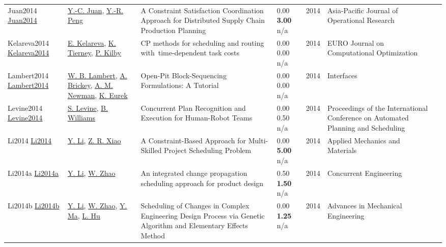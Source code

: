 {\begin{longtable}{p{3cm}p{5cm}p{10cm}p{1cm}rp{2.5cm}l}
Juan2014 \href{http://dx.doi.org/10.1142/s0217595914500419}{Juan2014} & \hyperref[auth:a1981]{Y.-C. Juan}, \hyperref[auth:a1982]{Y.-R. Peng} & A Constraint Satisfaction Coordination Approach for Distributed Supply Chain Production Planning & \noindent{}\textcolor{black!50}{0.00} \textbf{3.00} n/a & 2014 & Asia-Pacific Journal of Operational Research & \cite{Juan2014}\\
Kelareva2014 \href{http://dx.doi.org/10.1007/s13675-014-0022-7}{Kelareva2014} & \hyperref[auth:a332]{E. Kelareva}, \hyperref[auth:a333]{K. Tierney}, \hyperref[auth:a334]{P. Kilby} & \cellcolor{gold!20}CP methods for scheduling and routing with time-dependent task costs & \noindent{}\textcolor{black!50}{0.00} \textcolor{black!50}{0.00} n/a & 2014 & EURO Journal on Computational Optimization & \cite{Kelareva2014}\\
Lambert2014 \href{http://dx.doi.org/10.1287/inte.2013.0731}{Lambert2014} & \hyperref[auth:a1558]{W. B. Lambert}, \hyperref[auth:a1559]{A. Brickey}, \hyperref[auth:a1560]{A. M. Newman}, \hyperref[auth:a1561]{K. Eurek} & Open-Pit Block-Sequencing Formulations: A Tutorial & \noindent{}\textcolor{black!50}{0.00} \textcolor{black!50}{0.00} n/a & 2014 & \cellcolor{red!20}Interfaces & \cite{Lambert2014}\\
Levine2014 \href{http://dx.doi.org/10.1609/icaps.v24i1.13672}{Levine2014} & \hyperref[auth:a1927]{S. Levine}, \hyperref[auth:a1928]{B. Williams} & Concurrent Plan Recognition and Execution for Human-Robot Teams & \noindent{}\textcolor{black!50}{0.00} 0.50 n/a & 2014 & Proceedings of the International Conference on Automated Planning and Scheduling & \cite{Levine2014}\\
Li2014 \href{http://dx.doi.org/10.4028/www.scientific.net/amm.681.265}{Li2014} & \hyperref[auth:a1492]{Y. Li}, \hyperref[auth:a1493]{Z. R. Xiao} & A Constraint-Based Approach for Multi-Skilled Project Scheduling Problem & \noindent{}\textcolor{black!50}{0.00} \textbf{5.00} n/a & 2014 & Applied Mechanics and Materials & \cite{Li2014}\\
Li2014a \href{http://dx.doi.org/10.1177/1063293x14553809}{Li2014a} & \hyperref[auth:a2002]{Y. Li}, \hyperref[auth:a2003]{W. Zhao} & An integrated change propagation scheduling approach for product design & \noindent{}0.50 \textbf{1.50} n/a & 2014 & Concurrent Engineering & \cite{Li2014a}\\
Li2014b \href{http://dx.doi.org/10.1155/2014/169097}{Li2014b} & \hyperref[auth:a2002]{Y. Li}, \hyperref[auth:a2003]{W. Zhao}, \hyperref[auth:a2017]{Y. Ma}, \hyperref[auth:a2018]{L. Hu} & \cellcolor{gold!20}Scheduling of Changes in Complex Engineering Design Process via Genetic Algorithm and Elementary Effects Method & \noindent{}\textcolor{black!50}{0.00} \textbf{1.25} n/a & 2014 & Advances in Mechanical Engineering & \cite{Li2014b}\\

\end{longtable}}
